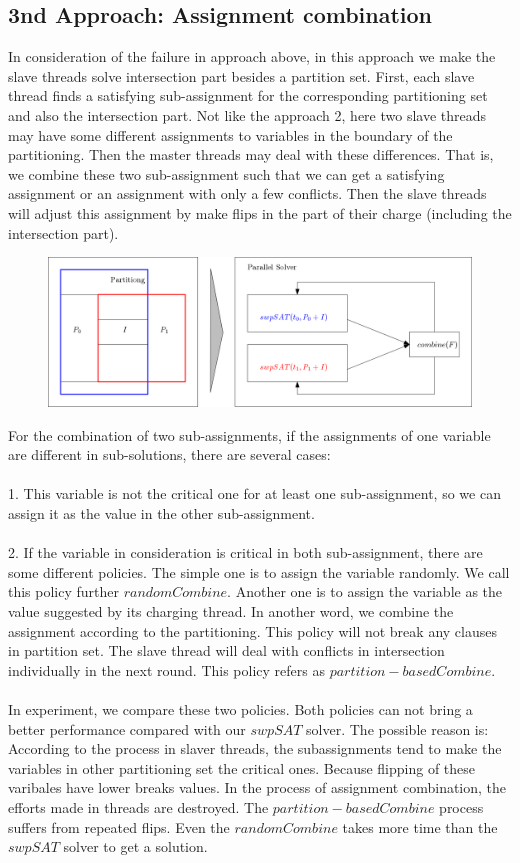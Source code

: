 \documentclass[12pt,a4paper,twoside]{scrartcl}
\numberwithin{equation}{section}
\begin{document}
\subsection{3nd Approach: Assignment combination}
In consideration of the failure in approach above, in this approach we make the slave threads solve intersection part besides a partition set. First, each slave thread finds a satisfying sub-assignment for the corresponding partitioning set and also the intersection part. Not like the approach 2, here two slave threads may have some different assignments to variables in the boundary of the partitioning. Then the master threads may deal with these differences. That is, we combine these two sub-assignment such that we can get a satisfying assignment or an assignment with only a few conflicts. Then the slave threads will adjust this assignment by make flips in the part of their charge (including the intersection part). 
\begin{figure}[H]
\begin{center}
  \includegraphics[scale = 0.3]{1/a3.png}
  \end{center}
  \label{a2}
  \end{figure}
For the combination of two sub-assignments, if the assignments of one variable are different in  sub-solutions, there are several cases:\\ 
\\
1. This variable is not the critical one for at least one sub-assignment, so we can assign it as the value in the other sub-assignment.\\
\\
2. If the variable in consideration is critical in both sub-assignment, there are some different policies. The simple one is to assign the variable randomly. We call this policy further $randomCombine$. Another one is to assign the variable as the value suggested by its charging thread. In another word, we combine the assignment according to the partitioning. This policy will not break any clauses in partition set. The slave thread will deal with conflicts in intersection individually in the next round. This policy refers as $partition-based Combine$.\\
\\ In experiment, we compare these two policies. Both policies can not bring a better performance compared with our $swpSAT$ solver. The possible reason is: According to the process in slaver threads, the subassignments  tend to make the variables in other partitioning set the critical ones. Because flipping of these varibales have lower breaks values. In the process of assignment combination, the efforts made in threads are destroyed.  The $partition-based Combine$ process suffers from repeated flips. Even the $randomCombine$ takes more time than the  $swpSAT$ solver to get a solution.
\end{document}

